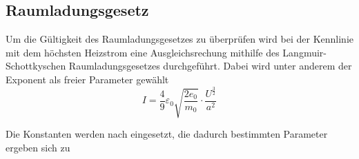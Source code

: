 \subsection{Raumladungsgesetz}

Um die Gültigkeit des Raumladungsgesetzes zu überprüfen wird bei der Kennlinie mit
dem höchsten Heizstrom eine Ausgleichsrechung mithilfe des Langmuir-Schottkyschen
Raumladungsgesetzes durchgeführt. 
Dabei wird unter anderem der Exponent als freier Parameter gewählt
\begin{equation}
  I= \frac{4}{9} \varepsilon_{0} \sqrt{\frac{2 e_{0}}{m_{0}}} \cdot \frac{U^{\frac{3}{2}}}{a^2}
\end{equation}

Die Konstanten werden nach eingesetzt, die dadurch bestimmten Parameter ergeben
sich zu